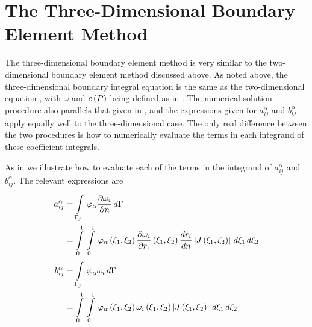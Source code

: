   


\section{The Three-Dimensional Boundary Element Method}
\label{sec:The3-DBE}

The three-dimensional boundary element method is very similar to the
two-dimensional boundary element method discussed above.  As noted above, the
three-dimensional boundary integral equation is the same as the
two-dimensional equation , with $\omega$ and $ c\left( P \right) $ being
defined as in .  The numerical solution procedure also
parallels that given in , and the expressions given for
$a_{ij}^{\alpha}$ and $b_{ij}^{\alpha}$ apply equally well to the
three-dimensional case.  The only real difference between the two procedures
is how to numerically evaluate the terms in each integrand of these
coefficient integrals.

As in  we illustrate how to evaluate each of the
terms in the integrand of $a_{ij}^{\alpha}$ and $b_{ij}^{\alpha}$.  The
relevant expressions are
\begin{align}
  a_{ij}^{\alpha} &=   \displaystyle\int\limits_{\Gamma_{j}}^{} \, \varphi_{\alpha} 
     \dfrac{\partial \omega_{i}}{\partial n} \,d\Gamma  \nonumber \\ &=
    \displaystyle\int\limits_{0}^{1} \,  \displaystyle\int\limits_{0}^{1} \,  \varphi_{\alpha} \left( \xi_{1},\xi_{2} \right) 
        \dfrac{\partial \omega_{i}}{\partial r_{i}} \left( \xi_{1},\xi_{2} \right)   \dfrac{ d r_{i}}{d n} 
      \left|  J\left( \xi_{1},\xi_{2} \right)  \right|\,d\xi_{1} \,d\xi_{2}  \\ 
  b_{ij}^{\alpha}
  &=   \displaystyle\int\limits_{\Gamma_{j}}^{} \, \varphi_{\alpha}  \omega_{i}\,d\Gamma  \nonumber \\ 
  &=   \displaystyle\int\limits_{0}^{1} \,  \displaystyle\int\limits_{0}^{1} \,  \varphi_{\alpha} \left( \xi_{1},\xi_{2} \right) 
       \omega_{i}\left( \xi_{1},\xi_{2} \right)  \left|  J\left( \xi_{1},\xi_{2} \right)  \right|\,d\xi_{1} \,d\xi_{2} 
\end{align}

